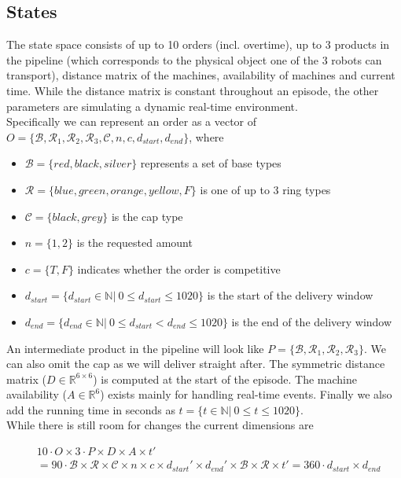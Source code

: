 \documentclass[runningheads,envcountsect]{llncs}
\begin{document}
\subsection{States} \label{states}
The state space consists of up to 10 orders (incl. overtime), up to 3 products in the pipeline (which corresponds to the physical object one of the 3 robots can transport), distance matrix of the machines, availability of machines and current time. While the distance matrix is constant throughout an episode, the other parameters are simulating a dynamic real-time environment.\\
Specifically we can represent an order as a vector of $O=\{\mathcal{B}, \mathcal{R}_1, \mathcal{R}_2, \mathcal{R}_3, \mathcal{C}, n, c, d_{start}, d_{end}  \}$, where
\begin{itemize}
  \item $\mathcal{B}=\{red, black, silver\}$ represents a set of base types
  \item $\mathcal{R}=\{blue, green, orange, yellow, F\}$ is one of up to 3 ring types
  \item $\mathcal{C}=\{black, grey\}$ is the cap type
  \item $n = \{1,2\}$ is the requested amount
  \item $c = \{T, F\}$ indicates whether the order is competitive
  \item $d_{start} = \{d_{start} \in \mathbb{N}|\ 0 \leq d_{start} \leq 1020 \}$ is the start of the delivery window
  \item $d_{end} = \{d_{end} \in \mathbb{N}|\ 0 \leq d_{start} < d_{end} \leq 1020 \}$ is the end of the delivery window
\end{itemize}
An intermediate product in the pipeline will look like $P=\{\mathcal{B}, \mathcal{R}_1, \mathcal{R}_2, \mathcal{R}_3\}$. We can also omit the cap as we will deliver straight after.
The symmetric distance matrix ($D \in \mathbb{R}^{6 \times 6}$) is computed at the start of the episode. 
The machine availability ($A \in \mathbb{R}^6$) exists mainly for handling real-time events.
Finally we also add the running time in seconds as $t = \{t \in \mathbb{N}|\ 0 \leq t \leq 1020 \}$.\\

While there is still room for changes the current dimensions are

\begin{align*}
&10 \cdot O \times 
3 \cdot P \times 
D \times
A \times
t' \\
&= 90 \cdot \mathcal{B} \times 
\mathcal{R} \times 
\mathcal{C} \times 
n \times 
c \times 
d_{start}' \times 
d_{end}' \times 
\mathcal{B} \times
\mathcal{R} \times 
t' 
= 360 \cdot d_{start} \times d_{end}
\end{align*}
\end{document}
